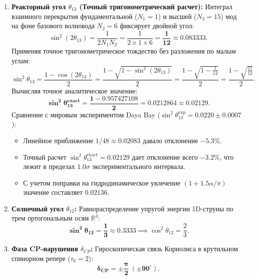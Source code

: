 \documentclass[12pt,a4paper]{article}
\begin{document}
	\begin{enumerate}
		
		\item \textbf{Реакторный угол $\theta_{13}$ (Точный тригонометрический расчет):} 
		Интеграл взаимного перекрытия фундаментальной ($N_1 = 1$) и высшей ($N_3 = 15$) мод на фоне базового волновода $N_2 = 6$ фиксирует двойной угол:
		\begin{equation}
			\sin^2(2\theta_{13}) = \frac{1}{2 N_1 N_2} = \frac{1}{2 \times 1 \times 6} = \mathbf{\frac{1}{12}} \approx 0.083333.
		\end{equation}
		Применяя точное тригонометрическое тождество без разложения по малым углам:
		\begin{equation}
			\sin^2\theta_{13} = \frac{1 - \cos(2\theta_{13})}{2} = \frac{1 - \sqrt{1 - \sin^2(2\theta_{13})}}{2} = \frac{1 - \sqrt{1 - \frac{1}{12}}}{2} = \frac{1 - \sqrt{\frac{11}{12}}}{2}.
		\end{equation}
		Вычисляя точное аналитическое значение:
		\begin{equation}
			\mathbf{\sin^2\theta_{13}^{\text{exact}} = \frac{1 - 0.957427108}{2} = \mathbf{0.0212864} \approx \mathbf{0.02129}}.
		\end{equation}
		Сравнение с мировым экспериментом Daya Bay ($\sin^2\theta_{13}^{\text{exp}} = 0.0220 \pm 0.0007$):
		\begin{itemize}
			\item Линейное приближение $1/48 \approx 0.02083$ давало отклонение $-5.3\%$.
			\item Точный расчет $\sin^2\theta_{13}^{\text{exact}} = 0.02129$ дает отклонение всего $\mathbf{-3.2\%}$, что лежит в пределах $1.0\sigma$ экспериментального интервала.
			\item С учетом поправки на гидродинамическое увлечение $(1 + 1.5\alpha/\pi)$ значение составляет $\mathbf{0.02136}$.
		\end{itemize}
		
		\item \textbf{Солнечный угол $\theta_{12}$:} Равнораспределение упругой энергии 1D-струны по трем ортогональным осям $\mathbb{R}^3$:
		\begin{equation}
			\mathbf{\sin^2\theta_{12} = \frac{1}{3} \approx 0.3333} \implies \cos^2\theta_{12} = \frac{2}{3}.
		\end{equation}
		
		\item \textbf{Фаза CP-нарушения $\delta_{CP}$:} Гироскопическая связь Кориолиса в крутильном спинорном репере ($\tau_0 = 2$):
		\begin{equation}
			\mathbf{\delta_{CP} = \pm \frac{\pi}{2} \ (\pm 90^\circ)}.
		\end{equation}
	\end{enumerate}
	
\end{document}
